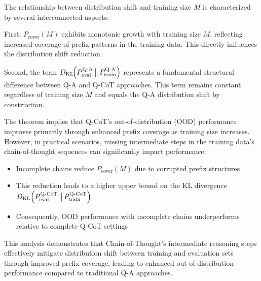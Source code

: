 \begin{remark}
The relationship between distribution shift and training size $M$ is characterized by several interconnected aspects:

First, $P_{\text{cover}}(M)$ exhibits monotonic growth with training size $M$, reflecting increased coverage of prefix patterns in the training data. This directly influences the distribution shift reduction.

Second, the term $D_{\mathrm{KL}}\!\Bigl(P_{\text{eval}}^{\text{Q-A}}\,\big\|\,P_{\text{train}}^{\text{Q-A}}\Bigr)$ represents a fundamental structural difference between Q-A and Q-CoT approaches. This term remains constant regardless of training size $M$ and equals the Q-A distribution shift by construction.

The theorem implies that Q-CoT's out-of-distribution (OOD) performance improves primarily through enhanced prefix coverage as training size increases. However, in practical scenarios, missing intermediate steps in the training data's chain-of-thought sequences can significantly impact performance:
\begin{itemize}
\item Incomplete chains reduce $P_{\text{cover}}(M)$ due to corrupted prefix structures
\item This reduction leads to a higher upper bound on the KL divergence $D_{\mathrm{KL}}\Bigl(P_{\text{eval}}^{\text{Q-CoT}}\,\big\|\,P_{\text{train}}^{\text{Q-CoT}}\Bigr)$
\item Consequently, OOD performance with incomplete chains underperforms relative to complete Q-CoT settings
\end{itemize}

This analysis demonstrates that Chain-of-Thought's intermediate reasoning steps effectively mitigate distribution shift between training and evaluation sets through improved prefix coverage, leading to enhanced out-of-distribution performance compared to traditional Q-A approaches.
\end{remark}
























